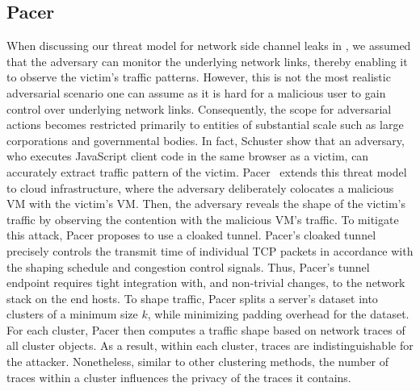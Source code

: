 \subsection{Pacer}\label{subsubsec:background-defenses-pacer}
When discussing our threat model for network side channel leaks in , we assumed that the adversary can monitor the underlying network links, thereby enabling it to observe the victim's traffic patterns.
However, this is not the most realistic adversarial scenario one can assume as it is hard for a malicious user to gain control over underlying network links.
Consequently, the scope for adversarial actions becomes restricted primarily to entities of substantial scale such as large corporations and governmental bodies.
In fact, Schuster show that an adversary, who executes JavaScript client code in the same browser as a victim, can accurately extract traffic pattern of the victim.
Pacer~\cite{mehta2022pacer} extends this threat model to cloud infrastructure, where the adversary deliberately colocates a malicious VM with the victim's VM.
Then, the adversary reveals the shape of the victim's traffic by observing the contention with the malicious VM's traffic.
To mitigate this attack, Pacer \cite{mehta2022pacer} proposes to use a cloaked tunnel.
Pacer's cloaked tunnel precisely controls the transmit time of individual
TCP packets in accordance with the shaping schedule and congestion control
signals.
Thus, Pacer's tunnel endpoint requires tight integration with, and
non-trivial changes, to the network stack on the end hosts.
To shape traffic, Pacer splits a server's dataset into clusters of a minimum size $k$, while minimizing padding overhead for the dataset.
For each cluster, Pacer then computes a traffic shape based on network traces of all cluster objects.
As a result, within each cluster, traces are indistinguishable for the attacker. 
Nonetheless, similar to other clustering methods, the number of traces within a cluster influences the privacy of the traces it contains.


